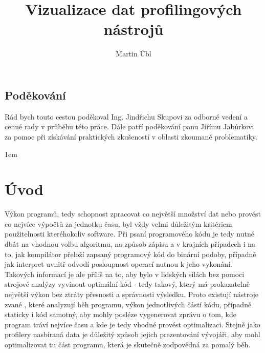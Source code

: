 \documentclass[czech,BP]{thesiskiv}
\author{Martin Úbl}
\title{Vizualizace dat profilingových nástrojů}
\begin{document}
\pagestyle{fancy}

\newcommand{\tick}{\ding{52}}
\newcommand{\tickcross}{\ding{55}}
\renewcommand{\chaptermark}[1]{\markboth{\textit{#1}}{}}
\renewcommand{\sectionmark}[1]{\markright{\textit{#1}}{}}
\cfoot{\thepage}
\lhead{\leftmark}
\rhead{\rightmark}
\maketitle

\thispagestyle{empty}
\section*{Poděkování}
Rád bych touto cestou poděkoval Ing. Jindřichu Skupovi za odborné vedení a cenné rady v průběhu této práce. Dále patří poděkování panu Jiřímu Jabůrkovi za pomoc při získávání praktických zkušeností v oblasti zkoumané problematiky.


\tableofcontents
\pagestyle{fancy}
\renewcommand{\chaptermark}[1]{\markboth{\textit{#1}}{}}
\renewcommand{\sectionmark}[1]{\markright{\textit{#1}}{}}
\cfoot{\thepage}
\lhead{\leftmark}
\rhead{\rightmark}
\parskip 1em

\newpage

\chapter{Úvod}
Výkon programů, tedy schopnost zpracovat co největší množství dat nebo provést co nejvíce výpočtů za jednotku času, byl vždy velmi důležitým kritériem použitelnosti kteréhokoliv software. Při psaní programového kódu je tedy nutné dbát na vhodnou volbu algoritmu, na způsob zápisu a v krajních případech i na to, jak kompilátor přeloží zapsaný programový kód do binární podoby, případně jak interpret uvnitř odvodí posloupnost operací nutnou k jeho vykonání. Takových informací je ale příliš na to, aby bylo v lidských silách bez pomoci strojové analýzy vyvinout optimální kód - tedy takový, který má prokazatelně největší výkon bez ztráty přesnosti a správnosti výsledku. Proto existují nástroje zvané , které analyzují běh programu, výkon jednotlivých částí kódu, případně staticky i kód samotný, aby mohly posléze vygenerovat zprávu o tom, kde program tráví nejvíce času a kde je tedy vhodné provést optimalizaci. Stejně jako profilery nasbíraná data je důležitý způsob jejich prezentování vývojáři, aby mohl optimalizovat tu část programu, která je skutečně zodpovědná za pomalý běh.
\end{document}
